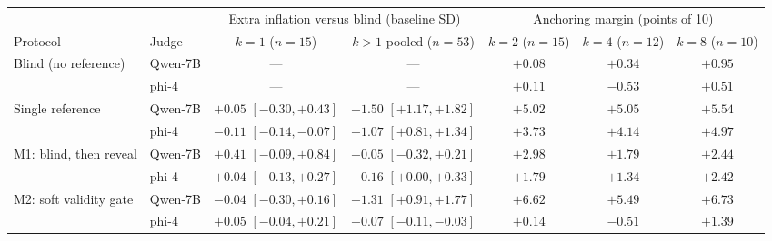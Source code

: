 \documentclass[11pt]{article}
\begin{document}
\begin{table}[tbp]
\centering
\footnotesize
\setlength{\tabcolsep}{2pt}
\begin{tabular}{llccccc}
\toprule
& & \multicolumn{2}{c}{Extra inflation versus blind (baseline SD)} & \multicolumn{3}{c}{Anchoring margin (points of 10)} \\
\cmidrule(lr){3-4} \cmidrule(lr){5-7}
Protocol & Judge & $k{=}1$ ($n{=}15$) & $k{>}1$ pooled ($n{=}53$) & $k{=}2$ ($n{=}15$) & $k{=}4$ ($n{=}12$) & $k{=}8$ ($n{=}10$) \\
\midrule
Blind (no reference) & Qwen-7B & --- & --- & $+0.08$ & $+0.34$ & $+0.95$ \\
      & phi-4   & --- & --- & $+0.11$ & $-0.53$ & $+0.51$ \\
\addlinespace
Single reference & Qwen-7B & $+0.05$ {\scriptsize$[-0.30, +0.43]$} & $\mathbf{+1.50}$ {\scriptsize$[+1.17, +1.82]$} & $+5.02$ & $+5.05$ & $+5.54$ \\
                 & phi-4   & $-0.11$ {\scriptsize$[-0.14, -0.07]$} & $\mathbf{+1.07}$ {\scriptsize$[+0.81, +1.34]$} & $+3.73$ & $+4.14$ & $+4.97$ \\
\addlinespace
M1: blind, then reveal & Qwen-7B & $+0.41$ {\scriptsize$[-0.09, +0.84]$} & $\mathbf{-0.05}$ {\scriptsize$[-0.32, +0.21]$} & $+2.98$ & $+1.79$ & $+2.44$ \\
                       & phi-4   & $+0.04$ {\scriptsize$[-0.13, +0.27]$} & $\mathbf{+0.16}$ {\scriptsize$[+0.00, +0.33]$} & $+1.79$ & $+1.34$ & $+2.42$ \\
\addlinespace
M2: soft validity gate & Qwen-7B & $-0.04$ {\scriptsize$[-0.30, +0.16]$} & $+1.31$ {\scriptsize$[+0.91, +1.77]$} & $+6.62$ & $+5.49$ & $+6.73$ \\
                      & phi-4   & $+0.05$ {\scriptsize$[-0.04, +0.21]$} & $\mathbf{-0.07}$ {\scriptsize$[-0.11, -0.03]$} & $\mathbf{+0.14}$ & $-0.51$ & $+1.39$ \\
\bottomrule
\end{tabular}


\end{table}
\end{document}

